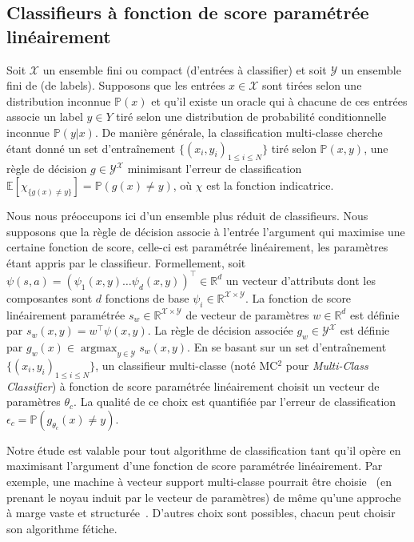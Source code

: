 \documentclass[english,utf8]{./hermes-journal}
\newcommand{\argmax}{\operatorname*{argmax}} %
\newcommand{\X}{\mathcal{X}}
\newcommand{\Y}{\mathcal{Y}}
\newcommand{\E}{\mathbb{E}}
\newcommand{\prob}{\mathbb{P}}
\begin{document}
\subsection{Classifieurs à fonction de score paramétrée linéairement} \label{subsec:background:classif}

Soit $\X$ un ensemble fini ou compact (d'entrées à classifier)
 et soit $\Y$ un ensemble fini de (de labels). Supposons que les entrées $x\in
\X$ sont tirées selon une distribution inconnue $\prob(x)$ et qu'il existe un oracle qui à chacune de ces entrées associe un label $y\in Y$ tiré selon une distribution de probabilité conditionnelle inconnue $\prob(y|x)$. De manière générale, la classification multi-classe cherche étant donné un set d'entraînement $\{(x_i,y_i)_{1\leq i \leq N}\}$ tiré selon $\prob(x,y)$, une règle de décision $g\in\Y^\X$ minimisant l'erreur de classification $\E[\chi_{\{g(x)\neq y\}}] = \prob(g(x)\neq y)$, où $\chi$ est la fonction indicatrice.

Nous nous préoccupons ici d'un ensemble plus réduit de classifieurs. Nous supposons que la règle de décision associe à l'entrée l'argument qui maximise une certaine fonction de score, celle-ci est paramétrée linéairement, les paramètres étant appris par le classifieur. Formellement, soit $\psi(s,a) =
(\psi_1(x,y)  \dots  \psi_d(x,y))^\top\in \mathbb{R}^d$
un vecteur d'attributs dont les composantes sont $d$ fonctions de base $\psi_i\in\mathbb{R}^{\X\times\Y}$. La fonction de score linéairement paramétrée $s_w\in\mathbb{R}^{\X\times \Y}$ de vecteur de paramètres $w\in\mathbb{R}^d$ est définie par $s_w(x,y) = w^\top \psi(x,y)$. La règle de décision associée $g_w\in{\Y^\X}$ est définie par $g_w(x) \in \argmax_{y\in\Y}s_w(x,y)$. En se basant sur un set d'entraînement $\{(x_i,y_i)_{1\leq
i\leq N}\}$, un classifieur multi-classe (noté MC$^2$ pour \emph{Multi-Class Classifier}) à fonction de score paramétrée linéairement choisit un vecteur de paramètres $\theta_c$. La qualité de ce choix est quantifiée par l'erreur de classification $\epsilon_c =
\prob(g_{\theta_c}(x)\neq y)$.

Notre étude est valable pour tout algorithme de classification tant qu'il opère en maximisant l'argument d'une fonction de score paramétrée linéairement. Par exemple, une machine à vecteur support multi-classe pourrait être choisie~\cite{Guermeur:2007} (en prenant le noyau induit par le vecteur de paramètres) de même qu'une approche à marge vaste et structurée~\cite{Taskar:2005}. D'autres choix sont possibles, chacun peut choisir son algorithme fétiche.
\end{document}
